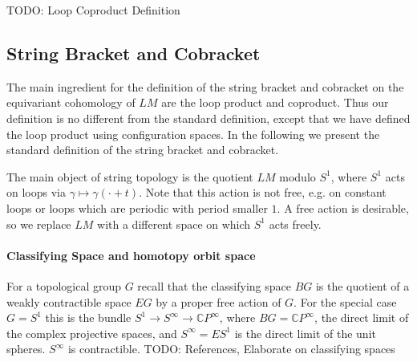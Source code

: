 \documentclass{scrartcl}
\theoremstyle{plain}
\theoremstyle{definition}
\newcommand{\C}{\mathbb C}
\begin{document}

TODO: Loop Coproduct Definition

\subsection{String Bracket and Cobracket}
The main ingredient for the definition of the string bracket and cobracket on the equivariant cohomology of $LM$ are the loop product and coproduct. Thus our definition is no different from the standard definition, except that we have defined the loop product using configuration spaces. In the following we present the standard definition of the string bracket and cobracket.

The main object of string topology is the quotient $LM$ modulo $S^1$, where $S^1$ acts on loops via $\gamma\mapsto \gamma(\cdot + t)$. Note that this action is not free, e.g. on constant loops or loops which are periodic with period smaller $1$. A free action is desirable, so we replace $LM$ with a different space on which $S^1$ acts freely.

\paragraph{Classifying Space and homotopy orbit space} For a topological group $G$ recall that the classifying space $BG$ is the quotient of a weakly contractible space $EG$ by a proper free action of $G$. For the special case $G=S^1$ this is the bundle $S^1\to S^\infty\to \C P^\infty$, where $BG = \C P^\infty$, the direct limit of the complex projective spaces, and $S^\infty = ES^1$ is the direct limit of the unit spheres. $S^\infty$ is contractible. TODO: References, Elaborate on classifying spaces
\end{document}
